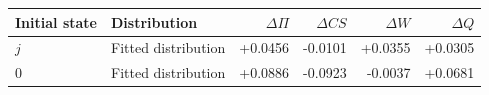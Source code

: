 \begin{tabular}{llrrrr}\toprule
Initial state & Distribution & $\Delta\Pi$ & $\Delta CS$ & $\Delta W$ & $\Delta Q$\\\midrule
$j$ & Fitted distribution & +0.0456 & -0.0101 & +0.0355 & +0.0305 \\
$0$ & Fitted distribution & +0.0886 & -0.0923 & -0.0037 & +0.0681 \\
\bottomrule\end{tabular}
